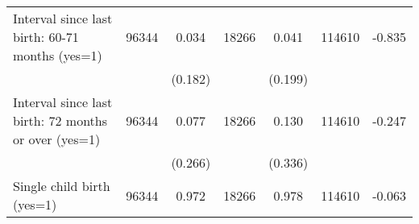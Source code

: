 \begin{tabular}{@{\extracolsep{5pt}}lcccccc}
Interval since last birth: 60-71 months (yes=1)   & 96344    & 0.034    & 18266    & 0.041    & 114610    & -0.835   \\                                                                                                                                                                                                                                                                                                                                                                                                                                                                                                       
 &   & (0.182)  &   & (0.199)  &   &  \\ [1ex]                                                                                                                                                                                                                                                                                                                                                                                                                                                                                                                                                                                
Interval since last birth: 72 months or over (yes=1)   & 96344    & 0.077    & 18266    & 0.130    & 114610    & -0.247   \\                                                                                                                                                                                                                                                                                                                                                                                                                                                                                                  
 &   & (0.266)  &   & (0.336)  &   &  \\ [1ex]                                                                                                                                                                                                                                                                                                                                                                                                                                                                                                                                                                                
Single child birth (yes=1)   & 96344    & 0.972    & 18266    & 0.978    & 114610    & -0.063   \\                                                                                                                                                                                                                                                                                                                                                                                                                                                                                                                            

\end{tabular}

